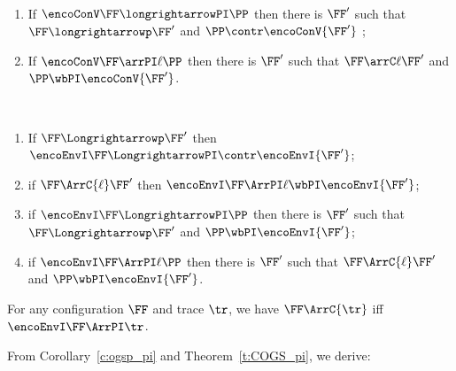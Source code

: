 \begin{lemma}
\label{l:opcorrCOGS2}
$ $ \begin{enumerate}


\item If 
$ \encoConV \FF \longrightarrowPI \PP$ then there is $\FF'$ such that 
$\FF \longrightarrowp \FF'$  and  
$\PP   \contr \encoConV {\FF'}$ ; 


\item If
$ \encoConV \FF \arrPI\ell \PP$
 then there is $\FF'$ such that
 $\FF \arrC\ell \FF'$
and $\PP \wbPI \encoConV {\FF'}$.

\end{enumerate} 
\end{lemma} 
 

\DSOCTe

\begin{theorem}
\label{t:COGS_pi}
$ $ \begin{enumerate}

\item
If   $\FF \Longrightarrowp \FF'$ then 
$\encoEnvI \FF \LongrightarrowPI  
\contr
\encoEnvI {\FF'}$;

\item
if   $\FF \ArrC{\ell} \FF'$ then 
$\encoEnvI \FF \ArrPI\ell  
\wbPI
\encoEnvI {\FF'}$;

\item %
if 
$\encoEnvI \FF \LongrightarrowPI   \PP$ then there is $\FF'$ such that 
   $\FF  \Longrightarrowp  \FF'$ and
$\PP  \wbPI
\encoEnvI {\FF'}$;

\item %
if 
$\encoEnvI \FF \ArrPI\ell   \PP$ then there is $\FF'$ such that 
   $\FF  \ArrC{\ell} \FF'$ and
$\PP \wbPI
\encoEnvI {\FF'}$.
 \end{enumerate} 
\end{theorem} 





\begin{corollary} %
\label{c:ogsp_pi}
For any  \COGS configuration $\FF$ 
 and trace $\tr$,  
we have  $\FF \ArrC{\tr}$ iff $\encoEnvI \FF \ArrPI \tr $.
\end{corollary} 

\noindent
From Corollary~\ref{c:ogsp_pi} 
and Theorem~\ref{t:COGS_pi}, we derive:

